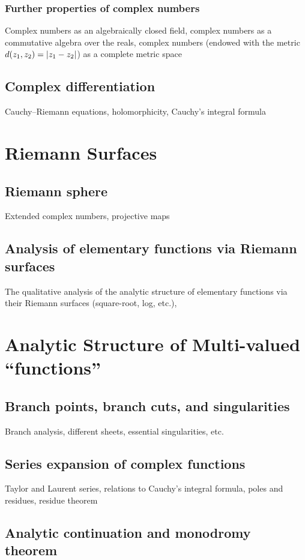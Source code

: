 \subsection{Further properties of complex numbers}
Complex numbers as an algebraically closed field, complex numbers as a commutative algebra over the reals, complex numbers (endowed with the metric $d(z_1,z_2)=\abs{z_1-z_2}$) as a complete metric space
\section{Complex differentiation}
Cauchy–Riemann equations, holomorphicity, Cauchy's integral formula

\chapter{Riemann Surfaces}
\section{Riemann sphere}
Extended complex numbers, projective maps
\section{Analysis of elementary functions via Riemann surfaces}
The qualitative analysis of the analytic structure of elementary functions via their Riemann surfaces (square-root, log, etc.),  

\chapter{Analytic Structure of Multi-valued ``functions''}
\section{Branch points, branch cuts, and singularities}
Branch analysis, different sheets, essential singularities, etc.
\section{Series expansion of complex functions}
Taylor and Laurent series, relations to Cauchy's integral formula, poles and residues, residue theorem
\section{Analytic continuation and monodromy theorem}